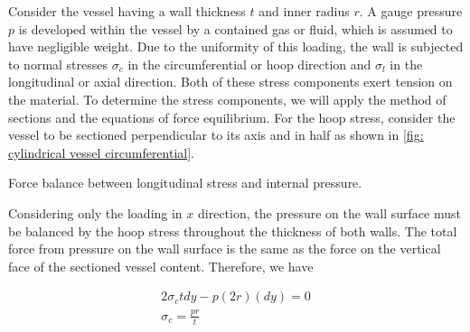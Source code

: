 \documentclass[
10pt,
a4paper,
openany,
svgnames,
]{kaobook} %
\begin{document}
Consider the vessel having a wall thickness $t$ and inner radius $r$. A gauge pressure $p$ is developed within the vessel by a contained gas or fluid, which is assumed to have negligible weight. Due to the uniformity of this loading, the wall is subjected to normal stresses $\sigma_c$ in the circumferential or hoop direction and $\sigma_l$ in the longitudinal or axial direction. Both of these stress components exert tension on the material. To determine the stress components, we will apply the method of sections and the equations of force equilibrium. For the hoop stress, consider the vessel to be sectioned perpendicular to its axis and in half as shown in \cref{fig: cylindrical vessel circumferential}.

\begin{marginfigure}
  \centering
  \caption{Force balance between longitudinal stress and internal pressure.}
  \label{fig: cylindrical vessel longitudinal}
\end{marginfigure}

Considering only the loading in $x$ direction, the pressure on the wall surface must be balanced by the hoop stress throughout the thickness of both walls. The total force from pressure on the wall surface is the same as the force on the vertical face of the sectioned vessel content. Therefore, we have

\begin{equation}
  \begin{gathered}
    2\sigma _ctdy - p(2r)(dy) = 0 \\ 
    {\sigma _c} = \frac{pr}{t} \\ 
  \end{gathered}
\end{equation}
\end{document}
